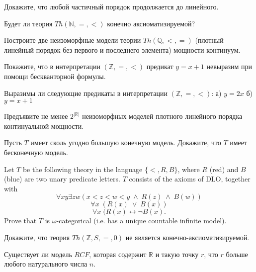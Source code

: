 \begin{task}
    Докажите, что любой частичный порядок продолжается до линейного.
\end{task}


\begin{task}
    Будет ли теория $Th(\mathbb{N}, =, <)$ конечно аксиоматизируемой?
\end{task}

\begin{task}
    Построите две неизоморфные модели теории $Th(\mathbb{Q}, <, =)$
    (плотный линейный порядок без первого и последнего элемента)
    мощности континуум.
\end{task}

\begin{task}
    Покажите, что в интерпретации $(\mathbb{Z}, =, <)$ предикат $y = x
    + 1$ невыразим при помощи бескванторной формулы.
\end{task}


\begin{task}
    Выразимы ли следующие предикаты в интерпретации
    $(\mathbb{Z}, =, <)$:
    а) $y = 2x$
    б) $y = x + 1$
\end{task}

\begin{task}
    Предъявите не менее $2^{|\mathbb{R}|}$ неизоморфных моделей плотного линейного порядка
    континуальной мощности.
\end{task}

\begin{task}
    Пусть $T$ имеет сколь угодно большую конечную модель. Докажите, что $T$ имеет
    бесконечную модель.
\end{task}


\breakline

\begin{task}
    Let $T$ be the following theory in the language $\{<, R, B\}$, where $R$ (red)
    and $B$ (blue) are two unary predicate letters. 
	$T$ consists of the axioms of DLO, together with 
	\[ \forall xy \exists zw (x<z<w<y \; \wedge \; R(z) \; \wedge \; B(w)) \]
	\[ \forall x \; (R(x)\; \vee \; B(x)) \]
	\[ \forall x \; (R(x) \leftrightarrow \neg B(x). \]
	Prove that $T$ is $\omega$-categorical (i.e. has a unique countable infinite model).
\end{task}

\begin{task}
    Докажите, что теория $Th(\mathbb{Z}, S, =, 0)$ не является
    конечно-аксиоматизируемой.
\end{task}

\breakline
\breakline
\breakline

\begin{task}
  	Существует ли модель $RCF$, которая содержит $\mathbb{R}$ и такую точку $r$, что
    $r$ больше любого натурального числа $n$.
\end{task}